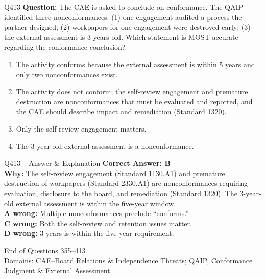 \documentclass[aspectratio=169,10pt]{beamer}
\begin{document}
	\begin{frame}[t]{Q413}
		\small
		\textbf{Question:} The CAE is asked to conclude on conformance. The QAIP identified three nonconformances: (1) one engagement audited a process the partner designed; (2) workpapers for one engagement were destroyed early; (3) the external assessment is 3 years old. Which statement is MOST accurate regarding the conformance conclusion?
		\begin{enumerate}[label=\Alph*.,itemsep=1pt,topsep=2pt]
			\item The activity conforms because the external assessment is within 5 years and only two nonconformances exist.
			\item The activity does not conform; the self-review engagement and premature destruction are nonconformances that must be evaluated and reported, and the CAE should describe impact and remediation (Standard 1320).
			\item Only the self-review engagement matters.
			\item The 3-year-old external assessment is a nonconformance.
		\end{enumerate}
	\end{frame}
	
	\begin{frame}[t]{Q413 -- Answer \& Explanation}
		\small
		\textbf{Correct Answer: B} \\[4pt]
		\textbf{Why:} The self-review engagement (Standard 1130.A1) and premature destruction of workpapers (Standard 2330.A1) are nonconformances requiring evaluation, disclosure to the board, and remediation (Standard 1320). The 3-year-old external assessment is within the five-year window. \\[4pt]
		\textbf{A wrong:} Multiple nonconformances preclude ``conforms.'' \\[2pt]
		\textbf{C wrong:} Both the self-review and retention issues matter. \\[2pt]
		\textbf{D wrong:} 3 years is within the five-year requirement.
	\end{frame}
	
	\begin{frame}
		\centering
		\Large End of Questions 355--413\\[8pt]
		\normalsize Domains: CAE--Board Relations \& Independence Threats; QAIP, Conformance Judgment \& External Assessment.
	\end{frame}
	
\end{document}
